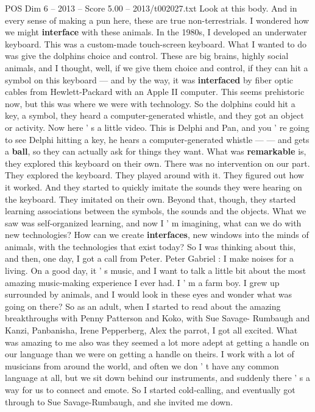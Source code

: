 \begin{textsample}{POS Dim 6 – 2013 – Score 5.00 – 2013/t002027.txt}
Look at this body.
And in every sense of making a pun here, these are true non-terrestrials.
I wondered how we might \textbf{interface} with these animals.
In the 1980s, I developed an underwater keyboard.
This was a custom-made touch-screen keyboard.
What I wanted to do was give the dolphins choice and control.
These are big brains, highly social animals, and I thought, well, if we give them choice and control, if they can hit a symbol on this keyboard — and by the way, it was \textbf{interfaced} by fiber optic cables from Hewlett-Packard with an Apple II computer.
This seems prehistoric now, but this was where we were with technology.
So the dolphins could hit a key, a symbol, they heard a computer-generated whistle, and they got an object or activity.
Now here ' s a little video.
This is Delphi and Pan, and you ' re going to see Delphi hitting a key, he hears a computer-generated whistle — — and gets a \textbf{ball}, so they can actually ask for things they want.
What was \textbf{remarkable} is, they explored this keyboard on their own.
There was no intervention on our part.
They explored the keyboard.
They played around with it.
They figured out how it worked.
And they started to quickly imitate the sounds they were hearing on the keyboard.
They imitated on their own.
Beyond that, though, they started learning associations between the symbols, the sounds and the objects.
What we saw was self-organized learning, and now I ' m imagining, what can we do with new technologies?
How can we create \textbf{interfaces}, new windows into the minds of animals, with the technologies that exist today?
So I was thinking about this, and then, one day, I got a call from Peter.
Peter Gabriel : I make noises for a living.
On a good day, it ' s music, and I want to talk a little bit about the most amazing music-making experience I ever had.
I ' m a farm boy.
I grew up surrounded by animals, and I would look in these eyes and wonder what was going on there?
So as an adult, when I started to read about the amazing breakthroughs with Penny Patterson and Koko, with Sue Savage- Rumbaugh and Kanzi, Panbanisha, Irene Pepperberg, Alex the parrot, I got all excited.
What was amazing to me also was they seemed a lot more adept at getting a handle on our language than we were on getting a handle on theirs.
I work with a lot of musicians from around the world, and often we don ' t have any common language at all, but we sit down behind our instruments, and suddenly there ' s a way for us to connect and emote.
So I started cold-calling, and eventually got through to Sue Savage-Rumbaugh, and she invited me down.

\end{textsample}
